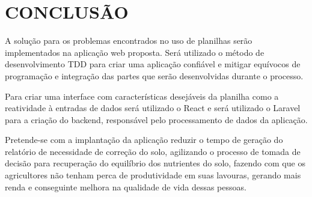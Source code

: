
\chapter{CONCLUSÃO}
\label{chap:conclusao}

A solução para os problemas encontrados no uso de planilhas serão implementados na aplicação web proposta. Será utilizado o método de desenvolvimento TDD para criar uma aplicação confiável e mitigar equívocos de programação e integração das partes que serão desenvolvidas durante o processo.

Para criar uma interface com características desejáveis da planilha como a reatividade à entradas de dados será utilizado o React e será utilizado o Laravel para a criação do backend, responsável pelo processamento de dados da aplicação.

Pretende-se com a implantação da aplicação reduzir o tempo de geração do relatório de necessidade de correção do solo, agilizando o processo de tomada de decisão para recuperação do equilíbrio dos nutrientes do solo, fazendo com que os agricultores não tenham perca de produtividade em suas lavouras, gerando mais renda e conseguinte melhora na qualidade de vida dessas pessoas.



